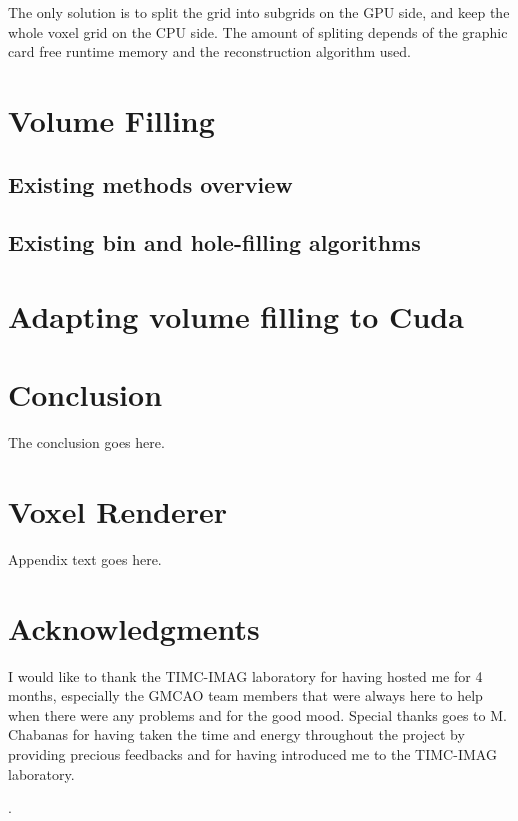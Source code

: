 \documentclass[12pt,journal,compsoc]{IEEEtran}
\begin{document}
The only solution is to split the grid into subgrids on the GPU side, and keep the whole voxel grid on the CPU side. The amount of spliting depends of the graphic card free runtime memory and the reconstruction algorithm used.

\section{Volume Filling}
\subsection{Existing methods overview}
\subsection{Existing bin and hole-filling algorithms}

\section{Adapting volume filling to Cuda}




\section{Conclusion}
The conclusion goes here.

\appendices
\section{Voxel Renderer}
Appendix text goes here.

\section*{Acknowledgments}
I would like to thank the TIMC-IMAG laboratory for having hosted me for 4 months, especially the GMCAO team members that were always here to help when there were any problems and for the good mood. Special thanks goes to M. Chabanas for having taken the time and energy throughout the project by providing precious feedbacks and for having introduced me to the TIMC-IMAG laboratory.

\cite{1}\cite{2}\cite{3}\cite{4}\cite{5}\cite{6}\cite{7}.





\end{document}
